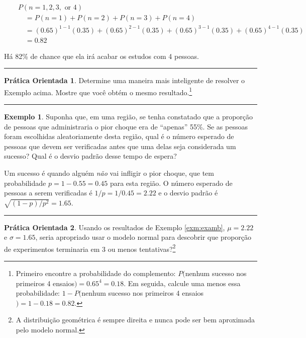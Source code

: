 \documentclass[
]{book}
\theoremstyle{definition}
\theoremstyle{definition}
\newtheorem{example}{Exemplo}[chapter]
\theoremstyle{definition}
\newtheorem{exercise}{Prática Orientada}[chapter]
\theoremstyle{definition}
\theoremstyle{remark}
\begin{document}
\begin{eqnarray*}
&&P(n=1, 2, 3,\text{ or }4) \\
    && \quad = P(n=1)+P(n=2)+P(n=3)+P(n=4) \\
    && \quad = (0.65)^{1-1}(0.35) + (0.65)^{2-1}(0.35) + (0.65)^{3-1}(0.35) + (0.65)^{4-1}(0.35) \\
    && \quad = 0.82
\end{eqnarray*}

Há 82\% de chance que ela irá acabar os estudos com 4 pessoas.

\begin{center}\rule{0.5\linewidth}{0.5pt}\end{center}

\begin{exercise}
\protect\hypertarget{exr:unnamed-chunk-125}{}{\label{exr:unnamed-chunk-125} }Determine uma maneira mais inteligente de resolver o Exemplo acima. Mostre que você obtém o mesmo resultado.\footnote{Primeiro encontre a probabilidade do complemento: \(P(\)nenhum sucesso nos primeiros 4 ensaios\() = 0.65^4 = 0.18\). Em seguida, calcule uma menos essa probabilidade: \(1-P(\)nenhum sucesso nos primeiros 4 ensaios\() = 1-0.18 = 0.82\).}
\end{exercise}

\begin{center}\rule{0.5\linewidth}{0.5pt}\end{center}

\begin{example}
\protect\hypertarget{exm:examb}{}{\label{exm:examb} }Suponha que, em uma região, se tenha constatado que a proporção de pessoas que administraria o pior choque era de ``apenas'' 55\%. Se as pessoas foram escolhidas aleatoriamente desta região, qual é o número esperado de pessoas que devem ser verificadas antes que uma delas seja considerada um sucesso? Qual é o desvio padrão desse tempo de espera?
\end{example}

Um sucesso é quando alguém \emph{não} vai infligir o pior choque, que tem probabilidade \(p=1-0.55=0.45\) para esta região. O número esperado de pessoas a serem verificadas é \(1/p = 1/0.45 = 2.22\) e o desvio padrão é \(\sqrt{(1-p)/p^2} = 1.65\).

\begin{center}\rule{0.5\linewidth}{0.5pt}\end{center}

\begin{exercise}
\protect\hypertarget{exr:unnamed-chunk-126}{}{\label{exr:unnamed-chunk-126} }Usando os resultados de Exemplo \ref{exm:examb}, \(\mu = 2.22\) e \(\sigma = 1.65\), seria apropriado usar o modelo normal para descobrir que proporção de experimentos terminaria em 3 ou menos tentativas?\footnote{A distribuição geométrica é sempre direita e nunca pode ser bem aproximada pelo modelo normal.}
\end{exercise}
\end{document}
